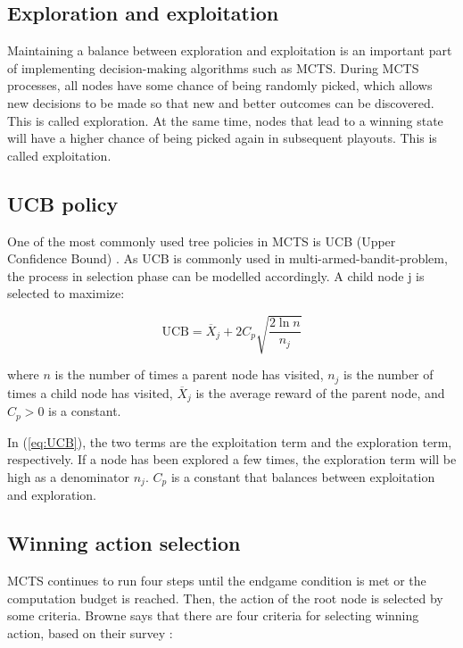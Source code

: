 \subsection{Exploration and exploitation}
Maintaining a balance between exploration and exploitation is an important part of implementing decision-making algorithms such as MCTS. During MCTS processes, all nodes have some chance of being randomly picked, which allows new decisions to be made so that new and better outcomes can be discovered. This is called exploration. At the same time, nodes that lead to a winning state will have a higher chance of being picked again in subsequent \glspl{playout}. This is called exploitation.

\subsection{UCB policy}
One of the most commonly used tree policies in MCTS is UCB (Upper Confidence Bound) \cite{RN2020}. As UCB is commonly used in \gls{multi-armed-bandit-problem}, the process in selection phase can be modelled accordingly. A child node j is selected to maximize:

\begin{equation}
  \label{eq:UCB}
  \mathrm{UCB} = \overline{X}_j + 2C_p\sqrt{\frac{2\ln n}{n_j}} 
\end{equation}

where $n$ is the number of times a parent node has visited, $n_j$ is the number of times a child node has visited, $\overline{X}_j$ is the average reward of the parent node, and $C_p > 0$ is a constant.

In (\ref{eq:UCB}), the two terms are the exploitation term and the exploration term, respectively. If a node has been explored a few times, the exploration term will be high as a denominator $n_j$. $C_p$ is a constant that balances between exploitation and exploration.

\subsection{Winning action selection} \label{winning-action}
MCTS continues to run four steps until the endgame condition is met or the computation budget is reached. Then, the action of the root node is selected by some criteria. \newline Browne says that there are four criteria for selecting winning action, based on their survey \cite{mcts-survey}:

